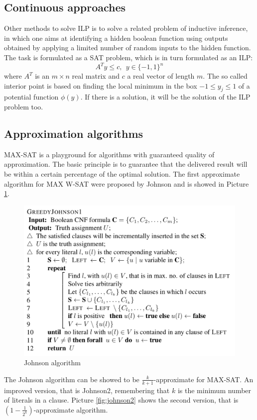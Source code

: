 \documentclass[10pt]{article}
\begin{document}
\subsection{Continuous approaches}
Other methods to solve ILP is to solve a related problem of inductive inference, in which one aims at identifying a hidden boolean function using outputs obtained by applying a limited number of random inputs to the hidden function. The task is formulated as a SAT problem, which is in turn formulated as an ILP:
$$
A^T y \leq c, \ \ y \in \{-1,1\}^n
$$
where $A^T$ is an $m \times n$ real matrix and $c$ a real vector of length $m$. The so called interior point is based on finding the local minimum in the box $-1 \leq y_j \leq 1$ of a potential function $\phi(y)$. If there is a solution, it will be the solution of the ILP problem too.

\subsection{Approximation algorithms}
MAX-SAT is a playground for algorithms with guaranteed quality of approximation. The basic principle is to guarantee that the delivered result will be within a certain percentage of the optimal solution. The first approximate algorithm for MAX W-SAT were proposed by Johnson and is showed in Picture \ref{fig:johnson}.

\begin{figure}[H]
\includegraphics[scale=0.5]{johnson}
\caption{Johnson algorithm}
\centering
\label{fig:johnson}
\end{figure}

The Johnson algorithm can be showed to be $\frac{k}{k+1}$-approximate for MAX-SAT. An improved version, that is Johnson2, remembering that $k$ is the minimum number of literals in a clause. Picture \ref{fig:johnson2} shows the second version, that is $(1 - \frac{1}{2^k})$-approximate algorithm. 
\end{document}
